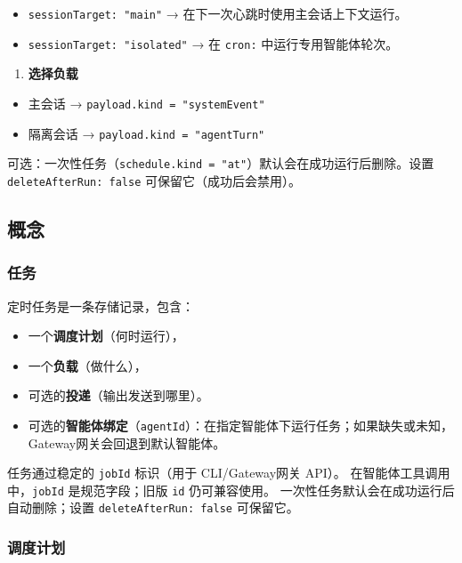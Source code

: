 \begin{itemize}
  \item \texttt{sessionTarget: "main"} → 在下一次心跳时使用主会话上下文运行。
  \item \texttt{sessionTarget: "isolated"} → 在 \texttt{cron:} 中运行专用智能体轮次。
\end{itemize}


\begin{enumerate}
  \item \textbf{选择负载}
\end{enumerate}

\begin{itemize}
  \item 主会话 → \texttt{payload.kind = "systemEvent"}
  \item 隔离会话 → \texttt{payload.kind = "agentTurn"}
\end{itemize}


可选：一次性任务（\texttt{schedule.kind = "at"}）默认会在成功运行后删除。设置
\texttt{deleteAfterRun: false} 可保留它（成功后会禁用）。

\subsection{概念}


\subsubsection{任务}


定时任务是一条存储记录，包含：

\begin{itemize}
  \item 一个\textbf{调度计划}（何时运行），
  \item 一个\textbf{负载}（做什么），
  \item 可选的\textbf{投递}（输出发送到哪里）。
  \item 可选的\textbf{智能体绑定}（\texttt{agentId}）：在指定智能体下运行任务；如果缺失或未知，Gateway网关会回退到默认智能体。
\end{itemize}


任务通过稳定的 \texttt{jobId} 标识（用于 CLI/Gateway网关 API）。
在智能体工具调用中，\texttt{jobId} 是规范字段；旧版 \texttt{id} 仍可兼容使用。
一次性任务默认会在成功运行后自动删除；设置 \texttt{deleteAfterRun: false} 可保留它。

\subsubsection{调度计划}


